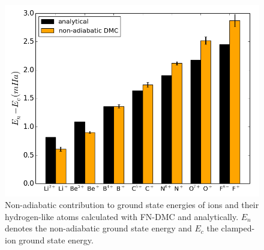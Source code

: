 \documentclass[pra,superscriptaddress,groupedaddress,twocolumn]{revtex4}
\begin{document}
\begin{figure}[h]
\includegraphics[scale=.4]{Figures/analytical}
\caption{Non-adiabatic contribution to ground state energies of ions and their hydrogen-like atoms calculated with FN-DMC and analytically. $E_n$ denotes the non-adiabatic ground state energy and $E_c$ the clamped-ion ground state energy. \label{fig:analytical}}
\end{figure}
\end{document}
